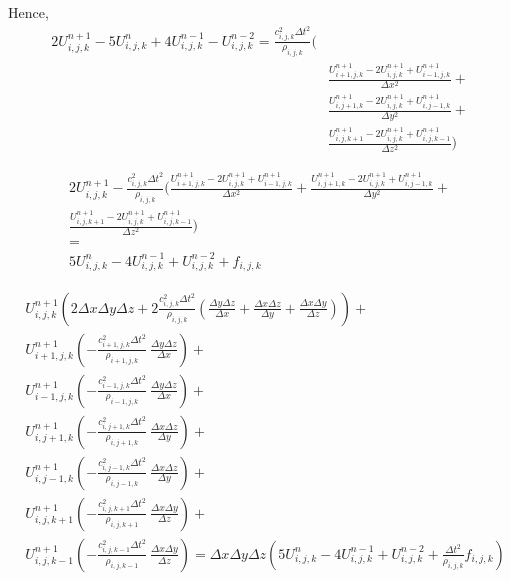 \documentclass[12pt,a4paper]{report}
\begin{document}
Hence,
\begin{equation}
\begin{aligned}
2 U^{n+1}_{i,j,k} - 5 U^{n}_{i,j,k} + 4 U^{n-1}_{i,j,k} - U^{n-2}_{i,j,k} = \frac{c^2_{i,j,k} \Delta t^2}{\rho_{i,j,k}} (\\
& \frac{U^{n+1}_{i+1,j,k} - 2 U^{n+1}_{i,j,k} + U^{n+1}_{i-1,j,k}}{\Delta x^2} +\\
& \frac{U^{n+1}_{i,j+1,k} - 2 U^{n+1}_{i,j,k} + U^{n+1}_{i,j-1,k}}{\Delta y^2} + \\
& \frac{U^{n+1}_{i,j,k+1} - 2 U^{n+1}_{i,j,k} + U^{n+1}_{i,j,k-1}}{\Delta z^2} )
\end{aligned}
\end{equation}

\begin{equation}
\begin{aligned}
2 U^{n+1}_{i,j,k} - \frac{c^2_{i,j,k} \Delta t^2}{\rho_{i,j,k}} (
\frac{U^{n+1}_{i+1,j,k} - 2 U^{n+1}_{i,j,k} + U^{n+1}_{i-1,j,k}}{\Delta x^2} +
\frac{U^{n+1}_{i,j+1,k} - 2 U^{n+1}_{i,j,k} + U^{n+1}_{i,j-1,k}}{\Delta y^2} + \\
\frac{U^{n+1}_{i,j,k+1} - 2 U^{n+1}_{i,j,k} + U^{n+1}_{i,j,k-1}}{\Delta z^2} ) \\= \\ 5 U^{n}_{i,j,k} - 4 U^{n-1}_{i,j,k} + U^{n-2}_{i,j,k} + f_{i,j,k}
\end{aligned}
\end{equation}
\fi

\begin{equation}
\begin{aligned}
& U^{n+1}_{i,j,k} \left(2 \Delta x \Delta y \Delta z + 2 \frac{c^2_{i,j,k} \Delta t^2}{\rho_{i,j,k}} \left( \frac{\Delta y \Delta z}{\Delta x} + \frac{\Delta x \Delta z}{\Delta y}+ \frac{\Delta x \Delta y}{\Delta z}\right)\right) + \\
& U^{n+1}_{i+1,j,k}  \left( -\frac{c^2_{i+1,j,k} \Delta t^2}{\rho_{i+1,j,k}}\ \frac{\Delta y \Delta z}{\Delta x}\right) + \\
& U^{n+1}_{i-1,j,k}  \left( -\frac{c^2_{i-1,j,k} \Delta t^2}{\rho_{i-1,j,k}}\ \frac{\Delta y \Delta z}{\Delta x}\right) + \\
& U^{n+1}_{i,j+1,k}  \left( -\frac{c^2_{i,j+1,k} \Delta t^2}{\rho_{i,j+1,k}}\ \frac{\Delta x \Delta z}{\Delta y}\right) + \\
& U^{n+1}_{i,j-1,k}  \left( -\frac{c^2_{i,j-1,k} \Delta t^2}{\rho_{i,j-1,k}}\ \frac{\Delta x \Delta z}{\Delta y}\right) + \\
& U^{n+1}_{i,j,k+1}  \left( -\frac{c^2_{i,j,k+1} \Delta t^2}{\rho_{i,j,k+1}}\ \frac{\Delta x \Delta y}{\Delta z}\right) + \\
& U^{n+1}_{i,j,k-1}  \left( -\frac{c^2_{i,j,k-1} \Delta t^2}{\rho_{i,j,k-1}}\ \frac{\Delta x \Delta y}{\Delta z}\right) = 
\Delta x \Delta y \Delta z \left( 5 U^{n}_{i,j,k} - 4 U^{n-1}_{i,j,k} + U^{n-2}_{i,j,k} + \frac{\Delta t^2}{\rho_{i,j,k}}f_{i,j,k} \right)
\end{aligned}
\end{equation}
\end{document}
